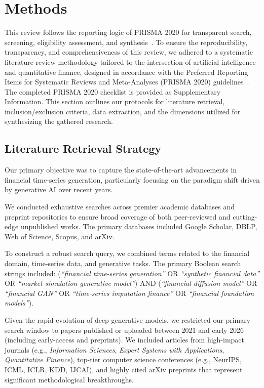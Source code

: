 \section{Methods}
\label{sec:methods}

This review follows the reporting logic of PRISMA 2020 for transparent search, screening, eligibility assessment, and synthesis~\citep{page2021prisma}.
To ensure the reproducibility, transparency, and comprehensiveness of this review, we adhered to a systematic literature review methodology tailored to the intersection of artificial intelligence and quantitative finance, designed in accordance with the Preferred Reporting Items for Systematic Reviews and Meta-Analyses (PRISMA 2020) guidelines~\citep{page2021prisma}. The completed PRISMA 2020 checklist is provided as Supplementary Information. This section outlines our protocols for literature retrieval, inclusion/exclusion criteria, data extraction, and the dimensions utilized for synthesizing the gathered research.

\subsection{Literature Retrieval Strategy}
Our primary objective was to capture the state-of-the-art advancements in financial time-series generation, particularly focusing on the paradigm shift driven by generative AI over recent years.

We conducted exhaustive searches across premier academic databases and preprint repositories to ensure broad coverage of both peer-reviewed and cutting-edge unpublished works. The primary databases included Google Scholar, DBLP, Web of Science, Scopus, and arXiv.

To construct a robust search query, we combined terms related to the financial domain, time-series data, and generative tasks. The primary Boolean search strings included:
(\textit{``financial time-series generation''} OR \textit{``synthetic financial data''} OR \textit{``market simulation generative model''}) AND (\textit{``financial diffusion model''} OR \textit{``financial GAN''} OR \textit{``time-series imputation finance''} OR \textit{``financial foundation models''}).

Given the rapid evolution of deep generative models, we restricted our primary search window to papers published or uploaded between 2021 and early 2026 (including early-access and preprints). We included articles from high-impact journals (e.g., \textit{Information Sciences}, \textit{Expert Systems with Applications}, \textit{Quantitative Finance}), top-tier computer science conferences (e.g., NeurIPS, ICML, ICLR, KDD, IJCAI), and highly cited arXiv preprints that represent significant methodological breakthroughs.

